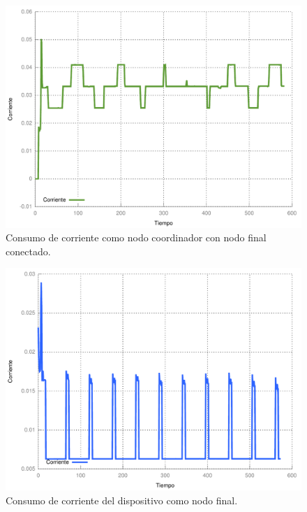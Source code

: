 \begin{figure}
	\centering
	\includegraphics[scale=0.5]{capitulo_4_imgs/corriente_sd_connodo.pdf}
	\caption{Consumo de corriente como nodo coordinador con nodo final conectado.}
	\label{fig:coordinador_connodo}
\end{figure}

\begin{figure}
	\centering
	\includegraphics[scale=0.5]{capitulo_4_imgs/corriente_sd_enddevice.pdf}
	\caption{Consumo de corriente del dispositivo como nodo final.}
	\label{fig:consumo_enddevice}
\end{figure}


